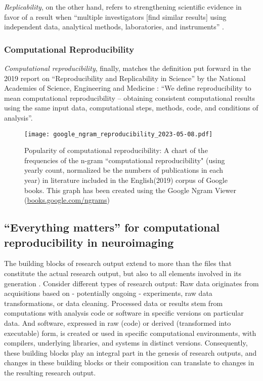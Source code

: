 \textit{Replicability}, on the other hand, refers to strengthening scientific evidence in favor of a result when ``multiple investigators [find similar results] using independent data, analytical methods, laboratories, and instruments''  \citep{peng2006}.

\subsubsection{Computational Reproducibility}

\textit{Computational reproducibility}, finally, matches the definition put forward in the 2019 report on ``Reproducibility and Replicability in Science'' by the National Academies of Science, Engineering and Medicine \citep{engineering2019reproducibility}: ``We define reproducibility to mean computational reproducibility – obtaining consistent computational results using the same input data, computational steps, methods, code, and conditions of analysis''.


\begin{figure}
	\centering
	\texttt{[image: google\_ngram\_reproducibility\_2023-05-08.pdf]}
	\caption[Computational reproducibility in the literature]{Popularity of computational reproducibility: A chart of the frequencies of the n-gram ``computational reproducibility" (using yearly count, normalized be the numbers of publications in each year) in literature included in the English(2019) corpus of Google books. This graph has been created using the Google Ngram Viewer (\href{https://books.google.com/ngrams/info}{books.google.com/ngrams}) \citep{michel2011quantitative}}
	\label{fig:ngram}
\end{figure}


\subsection{``Everything matters'' for computational reproducibility in neuroimaging}


The building blocks of research output extend to more than the files that constitute the actual research output, but also to all elements involved in its generation \citep{claerbout1992electronic}.
Consider different types of research output:
Raw data originates from acquisitions based on - potentially ongoing - experiments, raw data transformations, or data cleaning.
Processed data or results stem from computations with analysis code or software in specific versions on particular data.
And software, expressed in raw (code) or derived (transformed into executable) form, is created or used in specific computational environments, with compilers, underlying libraries, and systems in distinct versions.
Consequently, these building blocks play an integral part in the genesis of research outputs, and changes in these building blocks or their composition can translate to changes in the resulting research output.\\

